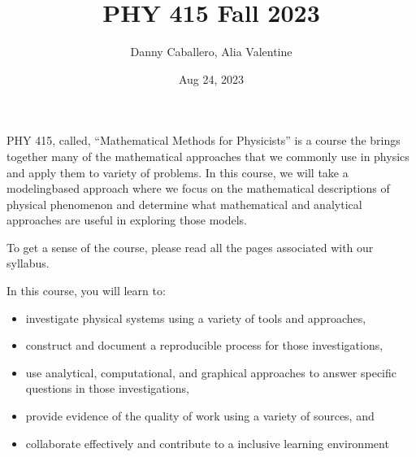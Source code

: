 \documentclass[letterpaper,10pt,english]{jupyterBook}
\title{PHY 415 Fall 2023}
\date{Aug 24, 2023}
\author{Danny Caballero, Alia Valentine}
\begin{document}
\pagestyle{empty}
\sphinxmaketitle
\pagestyle{plain}
\sphinxtableofcontents
\pagestyle{normal}
\label{\detokenize{content/intro::doc}}


\sphinxAtStartPar
PHY 415, called, “Mathematical Methods for Physicists” is a course the brings together many of the mathematical approaches that we commonly use in physics and apply them to variety of problems. In this course, we will take a modeling\sphinxhyphen{}based approach where we focus on the mathematical descriptions of physical phenomenon and determine what mathematical and analytical approaches are useful in exploring those models.

\sphinxAtStartPar
To get a sense of the course, please read all the pages associated with our syllabus.

\begin{DUlineblock}{0em}
\item[] 
\end{DUlineblock}

\sphinxAtStartPar
In this course, you will learn to:
\begin{itemize}
\item {} 
\sphinxAtStartPar
investigate physical systems using a variety of tools and approaches,

\item {} 
\sphinxAtStartPar
construct and document a reproducible process for those investigations,

\item {} 
\sphinxAtStartPar
use analytical, computational, and graphical approaches to answer specific questions in those investigations,

\item {} 
\sphinxAtStartPar
provide evidence of the quality of work using a variety of sources, and

\item {} 
\sphinxAtStartPar
collaborate effectively and contribute to a inclusive learning environment

\end{itemize}
\end{document}
